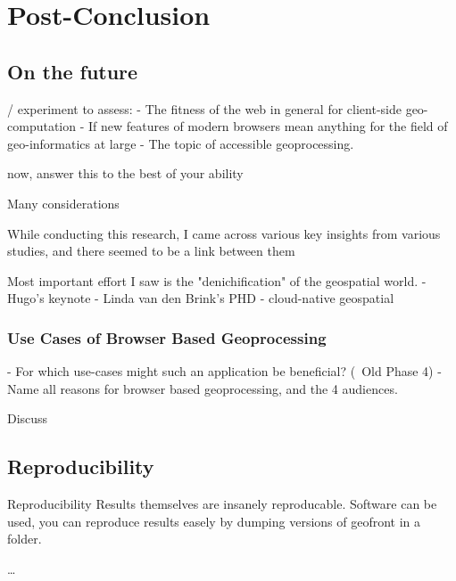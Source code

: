 \chapter{Post-Conclusion}%

\section{On the future}

/ experiment to assess: 
- The fitness of the web in general for client-side geo-computation
- If new features of modern browsers mean anything for the field of geo-informatics at large 
- The topic of accessible geoprocessing.

now, answer this to the best of your ability

Many considerations


While conducting this research, I came across various key insights from various studies, and there seemed to be a link between them 

Most important effort I saw is the "denichification" of the geospatial world.
- Hugo's keynote
- Linda van den Brink's PHD
- cloud-native geospatial 


\subsection{Use Cases of Browser Based Geoprocessing}



- For which use-cases might such an application be beneficial? (~Old Phase 4)
- Name all reasons for browser based geoprocessing, and the 4 audiences.

Discuss 

\section{Reproducibility}

Reproducibility
Results themselves are insanely reproducable.
Software can be used, you can reproduce results easely by dumping versions of geofront in 
a folder.

\dots

